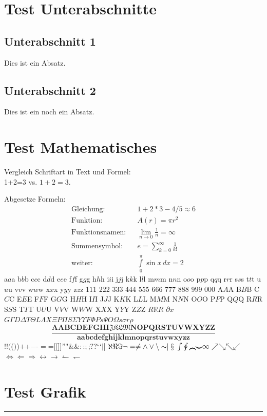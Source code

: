 \documentclass[serifmath,a0paper,noDIN,MathematikA0]{tudmathposter}
\begin{document}
\begin{multicols}{2}
\section*{Test Unterabschnitte}
\subsection*{Unterabschnitt 1}
Dies ist ein Absatz.
\subsection*{Unterabschnitt 2}
Dies ist ein noch ein Absatz.

\vfill
\section*{Test Mathematisches}
Vergleich Schriftart in Text und Formel:\\
1+2=3 vs. $1+2=3$.

Abgesetze Formeln:
\begin{eqnarray}
\mbox{Gleichung:}&&1+2*3-4/5\approx6\\
\mbox{Funktion:}&&A(r)=\pi r^2\\
\mbox{Funktionsnamen:}&&\lim_{n\to0}\frac{1}{n}=\infty\\
\mbox{Summensymbol:}&&e=\sum_{k=0}^{\infty}\frac{1}{k!}\\
\text{w$e$iter:}&&\int\limits_0^\pi \sin x\,dx = 2
\end{eqnarray}
a$a$a b$b$b c$c$c d$d$d e$e$e f$f$f g$g$g h$h$h i$i$i j$j$j k$k$k
l$l$l m$m$m n$n$n o$o$o p$p$p q$q$q r$r$r s$s$s t$t$t u$u$u v$v$v
w$w$w x$x$x y$y$y z$z$z 1$1$1 2$2$2 3$3$3 4$4$4 5$5$5 6$6$6 7$7$7
8$8$8 9$9$9 0$0$0 A$A$A B$B$B C$C$C E$E$E F$F$F G$G$G H$H$H I$I$I
J$J$J K$K$K L$L$L M$M$M N$N$N O$O$O P$P$P Q$Q$Q R$R$R S$S$S T$T$T
U$U$U V$V$V W$W$W X$X$X Y$Y$Y Z$Z$Z $R\mathbb RR$ $\partial x$
$G\Gamma D\Delta T\Theta L\Lambda X\Xi P\Pi S\Sigma Y\Upsilon F\Phi
Ps\Psi O\Omega s\sigma r\rho$ 
\[
\mathbf{\frac{\text{A}ABCDEFGHI\mathfrak{JKLM}NOPQRSTUVWXYZ\text{Z}}
{\text{a}abcdefghijklmnopqrstuvwxyz\text{z}}}
\]
$!$!$($($)$)$+$+$-$-$=$=$[$[$]$]$"$"$\&$\&$:$:$;$;$?$?$`$`$|$|
$\aleph\Re\Im\neg=\neq\wedge\vee\setminus\sim\mid\mathsection$
$\intop\ointop\braceld\bracerd\bracelu\braceru\infty\nearrow\searrow\nwarrow\swarrow$
$\Leftrightarrow\Leftarrow\Rightarrow\leftrightarrow\rightarrow\leftharpoonup\leftharpoondown$

\vfill
\section*{Test Grafik}
\rule{\linewidth}{2cm}
\end{multicols}
\end{document}
